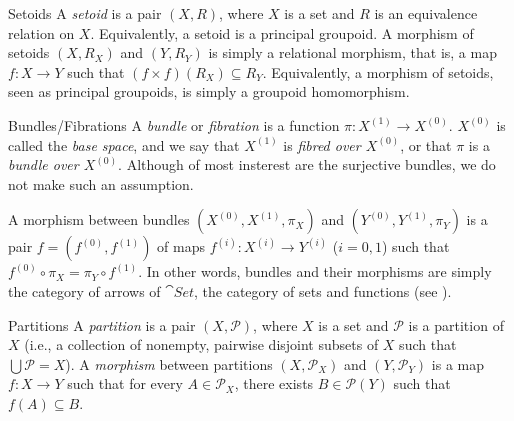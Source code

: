 \begin{denv*}{Setoids}
A \emph{setoid} is a pair $(X,R)$, where $X$ is a set and $R$ is an equivalence relation on $X$. Equivalently, a setoid is a principal groupoid. A morphism of setoids $(X,R_X)$ and $(Y,R_Y)$ is simply a relational morphism, that is, a map $f\colon X\to Y$ such that $(f\times f)(R_X)\subseteq R_Y$. Equivalently, a morphism of setoids, seen as principal groupoids, is simply a groupoid homomorphism.
\end{denv*}

\begin{denv*}{Bundles/Fibrations}
A \emph{bundle} or \emph{fibration} is a function $\pi\colon X^{(1)}\to X^{(0)}$. $X^{(0)}$ is called the \emph{base space}, and we say that $X^{(1)}$ is \emph{fibred over $X^{(0)}$}, or that $\pi$ is a \emph{bundle over $X^{(0)}$}. Although of most insterest are the surjective bundles, we do not make such an assumption.

A morphism between bundles $(X^{(0)},X^{(1)},\pi_X)$ and $(Y^{(0)},Y^{(1)},\pi_Y)$ is a pair $f=(f^{(0)},f^{(1)})$ of maps $f^{(i)}\colon X^{(i)}\to Y^{(i)}$ ($i=0,1$) such that $f^{(0)}\circ\pi_X=\pi_Y\circ f^{(1)}$. In other words, bundles and their morphisms are simply the category of arrows of $\cat{Set}$, the category of sets and functions (see \cite[p.\ 40]{MR1712872}).
\end{denv*}

\begin{denv*}{Partitions}
A \emph{partition} is a pair $(X,\mathscr{P})$, where $X$ is a set and $\mathscr{P}$ is a partition of $X$ (i.e., a collection of nonempty, pairwise disjoint subsets of $X$ such that $\bigcup\mathscr{P}=X$). A \emph{morphism} between partitions $(X,\mathscr{P}_X)$ and $(Y,\mathscr{P}_Y)$ is a map $f\colon X\to Y$ such that for every $A\in\mathscr{P}_X$, there exists $B\in\mathscr{P}(Y)$ such that $f(A)\subseteq B$.
\end{denv*}

